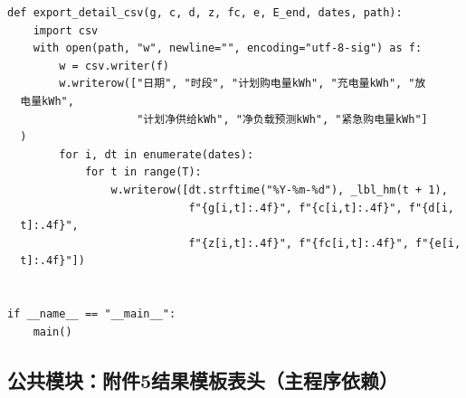 \begin{verbatim}
def export_detail_csv(g, c, d, z, fc, e, E_end, dates, path):
    import csv
    with open(path, "w", newline="", encoding="utf-8-sig") as f:
        w = csv.writer(f)
        w.writerow(["日期", "时段", "计划购电量kWh", "充电量kWh", "放
  电量kWh",
                    "计划净供给kWh", "净负载预测kWh", "紧急购电量kWh"]
  )
        for i, dt in enumerate(dates):
            for t in range(T):
                w.writerow([dt.strftime("%Y-%m-%d"), _lbl_hm(t + 1),
                            f"{g[i,t]:.4f}", f"{c[i,t]:.4f}", f"{d[i,
  t]:.4f}",
                            f"{z[i,t]:.4f}", f"{fc[i,t]:.4f}", f"{e[i,
  t]:.4f}"])


if __name__ == "__main__":
    main()
\end{verbatim}

\subsection{公共模块：附件5结果模板表头（主程序依赖）}


